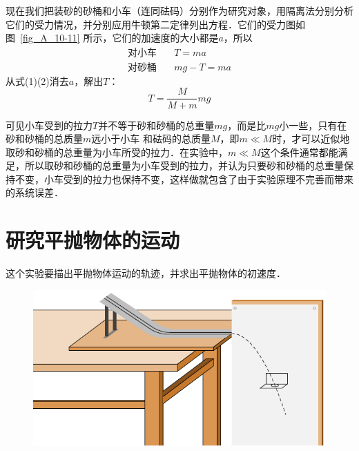 现在我们把装砂的砂桶和小车（连同砝码）分别作为研究对象，用隔离法分别分析它们的受力情况，并分别应用牛顿第二定律列出方程．它们的受力图如图~\ref{fig_A_10-11} 所示，它们的加速度的大小都是$a$，所以
\begin{align}
    \text{对小车}&\quad T=ma\\
    \text{对砂桶}&\quad mg-T=ma
\end{align}
从式(1)(2)消去$a$，解出$T$：
\begin{equation}
    T=\frac{M}{M+m}mg
\end{equation}

可见小车受到的拉力$T$并不等于砂和砂桶的总重量$mg$，而是比$mg$小一些，只有在砂和砂桶的总质量$m$远小于小车
和砝码的总质量$M$，即$m\ll M$时，才可以近似地取砂和砂桶的总重量为小车所受的拉力．在实验中，$m\ll M$这个条件通常都能满足，所以取砂和砂桶的总重量为小车受到的拉力，并认为只要砂和砂桶的总重量保持不变，小车受到的拉力也保持不变，这样做就包含了由于实验原理不完善而带来的系统误差．

\section{研究平抛物体的运动}

这个实验要描出平抛物体运动的轨迹，并求出平抛物体的初速度．
\begin{figure}[htbp]
    \centering
    \includegraphics{fig/A/10-12.pdf}
    \caption{}\label{fig_A_10-12}
    \end{figure}

